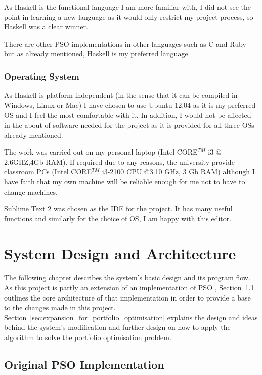 \documentclass{pdfmx4020}
\begin{document}
      As Haskell is the functional language I am more familiar with, I did not see the point in learning a new language as it would only restrict my project process, so Haskell was a clear winner. 

      There are other PSO implementations in other languages such as C and Ruby but as already mentioned, Haskell is my preferred language. 

    \subsection{Operating System} %
    \label{sub:operating_system}
    As Haskell is platform independent (in the sense that it can be compiled in Windows, Linux or Mac) I have chosen to use Ubuntu 12.04 as it is my preferred OS and I feel the most comfortable with it. In addition, I would not be affected in the about of software needed for the project as it is provided for all three OSs already mentioned. 

    The work was carried out on my personal laptop (Intel CORE$^{TM}$ i3 @ 2.6GHZ,4Gb RAM). If required due to any reasons, the university provide classroom PCs (Intel CORE$^{TM}$ i3-2100 CPU @3.10 GHz, 3 Gb RAM) although I have faith that my own machine will be reliable enough for me not to have to change machines. 
    
    Sublime Text 2 was chosen as the IDE for the project. It has many useful functions \cite{sublime} and similarly for the choice of OS, I am happy with this editor.
  

\chapter{System Design and Architecture}\label{chap:design}
The following chapter describes the system's basic design and its program flow. As this project is partly an extension of an implementation of PSO \cite{haskellPSO}, Section~\ref{sec:original_pso_implementation} outlines the core architecture of that implementation in order to provide a base to the changes made in this project. Section~\ref{sec:expansion_for_portfolio_optimisation} explains the design and ideas behind the system's modification and further design on how to apply the algorithm to solve the portfolio optimisation problem.

  \section{Original PSO Implementation} %
  \label{sec:original_pso_implementation}
\end{document}
